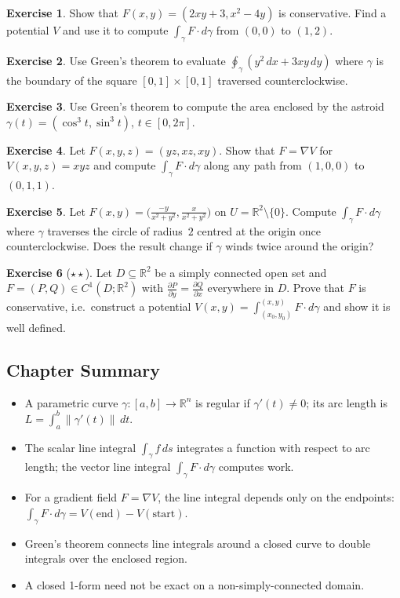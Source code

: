 \documentclass[12pt,a4paper]{book}
\theoremstyle{definition}
\newtheorem{exercise}{Exercise}[chapter]
\begin{document}
\begin{exercise}
Show that $F(x,y)=(2xy+3,x^2-4y)$ is conservative.  Find a potential $V$
and use it to compute $\int_\gamma F\cdot d\gamma$ from $(0,0)$ to $(1,2)$.
\end{exercise}

\begin{exercise}
Use Green's theorem to evaluate
$\oint_\gamma(y^2\,dx+3xy\,dy)$
where $\gamma$ is the boundary of the square $[0,1]\times[0,1]$ traversed
counterclockwise.
\end{exercise}

\begin{exercise}
Use Green's theorem to compute the area enclosed by the astroid
$\gamma(t)=(\cos^3 t,\sin^3 t)$, $t\in[0,2\pi]$.
\end{exercise}

\begin{exercise}
Let $F(x,y,z)=(yz,xz,xy)$.  Show that $F=\nabla V$ for $V(x,y,z)=xyz$ and
compute $\int_\gamma F\cdot d\gamma$ along any path from $(1,0,0)$ to
$(0,1,1)$.
\end{exercise}

\begin{exercise}
Let $F(x,y)=\bigl(\frac{-y}{x^2+y^2},\frac{x}{x^2+y^2}\bigr)$ on
$U=\mathbb{R}^2\setminus\{0\}$.  Compute $\int_\gamma F\cdot d\gamma$ where
$\gamma$ traverses the circle of radius~$2$ centred at the origin once
counterclockwise.  Does the result change if $\gamma$ winds twice around the
origin?
\end{exercise}

\begin{exercise}[$\star\star$]
Let $D\subseteq\mathbb{R}^2$ be a simply connected open set and
$F=(P,Q)\in C^1(D;\mathbb{R}^2)$ with
$\frac{\partial P}{\partial y}=\frac{\partial Q}{\partial x}$ everywhere in
$D$.  Prove that $F$ is conservative, i.e.\ construct a potential
$V(x,y)=\int_{(x_0,y_0)}^{(x,y)}F\cdot d\gamma$ and show it is well
defined.
\end{exercise}

\subsection*{Chapter Summary}

\begin{itemize}
  \item A parametric curve $\gamma\colon[a,b]\to\mathbb{R}^n$ is regular if
    $\gamma'(t)\ne 0$; its arc length is $L=\int_a^b\|\gamma'(t)\|\,dt$.
  \item The scalar line integral $\int_\gamma f\,ds$ integrates a function
    with respect to arc length; the vector line integral
    $\int_\gamma F\cdot d\gamma$ computes work.
  \item For a gradient field $F=\nabla V$, the line integral depends only on
    the endpoints: $\int_\gamma F\cdot d\gamma=V(\text{end})-V(\text{start})$.
  \item Green's theorem connects line integrals around a closed curve to
    double integrals over the enclosed region.
  \item A closed 1-form need not be exact on a non-simply-connected domain.
\end{itemize}
\end{document}
